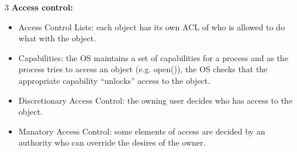 \documentclass[8pt]{innovativeinnovation-cheatsheet}
\begin{document}
\begin{multicols*}{3}
\textbf{Access control:}
\begin{itemize}
      \item Access Control Lists: each object has its own ACL of who is allowed to do what with the object.
      \item Capabilities: the OS maintains a set of capabilities for a process and as the process tries to access an object (e.g. open()), the OS checks that the appropriate capability “unlocks” access to the object.
      \item Discretionary Access Control: the owning user decides who has access to the object.
      \item Manatory Access Control: some elements of access are decided by an authority who can override the desires of the owner.
\end{itemize}

\end{multicols*}
\end{document}
